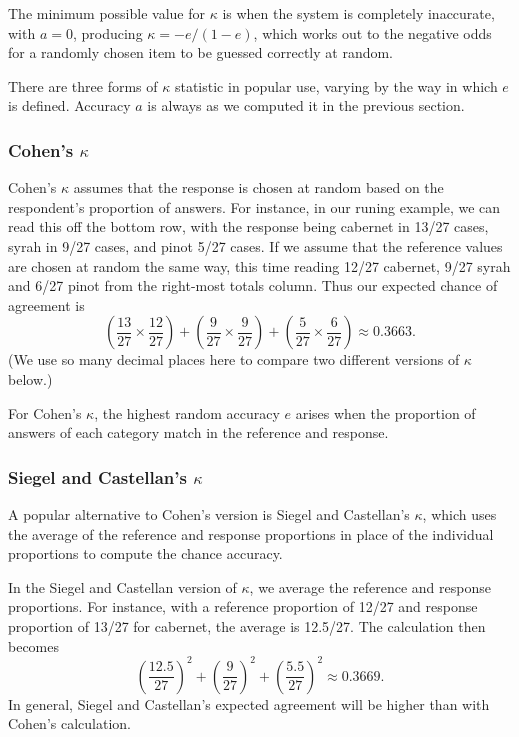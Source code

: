 The minimum possible value for $\kappa$ is when the system is
completely inaccurate, with $a=0$, producing $\kappa = -e/(1-e)$,
which works out to the negative odds for a randomly chosen item
to be guessed correctly at random.

There are three forms of $\kappa$ statistic in popular use, varying by
the way in which $e$ is defined.  Accuracy $a$ is always as we
computed it in the previous section.

\subsubsection{Cohen's $\kappa$}

Cohen's $\kappa$ assumes that the response is chosen at random based
on the respondent's proportion of answers.  For instance, in our
runing example, we can read this off the bottom row, with the response
being cabernet in 13/27 cases, syrah in 9/27 cases, and pinot 5/27
cases.  If we assume that the reference values are chosen at random
the same way, this time reading 12/27 cabernet, 9/27 syrah and 6/27
pinot from the right-most totals column.  Thus our expected chance
of agreement is 
%
\begin{equation}
\left(\frac{13}{27} \times \frac{12}{27}\right)
+ \left(\frac{9}{27} \times \frac{9}{27}\right)
+ \left(\frac{5}{27} \times \frac{6}{27}\right)
\approx 0.3663.
\end{equation}
%
(We use so many decimal places here to compare two different versions
of $\kappa$ below.)  

For Cohen's $\kappa$, the highest random accuracy $e$ arises when the
proportion of answers of each category match in the reference and response.

\subsubsection{Siegel and Castellan's $\kappa$}

A popular alternative to Cohen's version is Siegel and Castellan's
$\kappa$, which uses the average of the reference and response
proportions in place of the individual proportions to compute the
chance accuracy.

In the Siegel and Castellan version of $\kappa$, we average the
reference and response proportions.  For instance, with a reference
proportion of 12/27 and response proportion of 13/27 for cabernet,
the average is 12.5/27. The calculation then becomes
%
\begin{equation}
\left( \frac{12.5}{27} \right)^2
+ \left( \frac{9}{27} \right)^2
+ \left( \frac{5.5}{27} \right)^2
\approx 0.3669.
\end{equation}
%
In general, Siegel and Castellan's expected agreement will be higher
than with Cohen's calculation.


